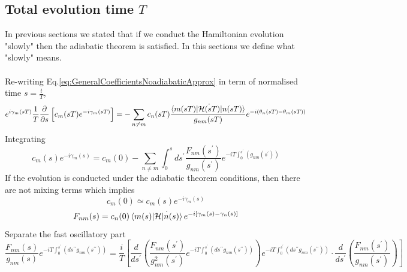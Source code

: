 \subsection{Total evolution time $T$}
In previous sections we stated that if we conduct the Hamiltonian evolution "slowly" then the adiabatic theorem is satisfied. In this sections we define what "slowly" means. \\\\
Re-writing Eq.\ref{eq:GeneralCoefficientsNoadiabaticApprox} in term of normalised time $s = \frac{t}{T}$,
\begin{equation}
    e^{i\gamma_{m}(sT)}\frac{1}{T}\frac{\partial }{\partial s}\left[c_{m}(sT)e^{-i\gamma_{m}(sT)}\right] = -\sum_{n\neq m} c_{n}(sT) \frac{\braket{m(sT)|\dot{\mathcal{H}(sT)}|n(sT)}}{g_{nm}(sT)}e^{-i\left(\theta_{n}(sT) - \theta_{m}(sT)\right)}
\end{equation}
Integrating
\begin{equation}
    c_{m}(s)e^{-i\gamma_{m}(s)} = c_{m}(0) - \sum_{n\neq m}\int_{0}^{s} ds^{\prime}\frac{F_{nm}(s^{\prime})}{g_{nm}(s^{\prime})}e^{-iT\int_{0}^{s^{\prime}}\left(g_{nm}(s^{\prime})\right)}
\end{equation}
If the evolution is conducted under the adiabatic theorem conditions, then there are not mixing terms which implies
\begin{equation}
    c_{m}(0) \simeq c_{m}(s)e^{-i\gamma_{m}(s)}
\end{equation}
\begin{equation}
    F_{nm}(s) = c_{n}(0)\braket{m(s)|\dot{\mathcal{H}|n(s)}} e^{-i\left[\gamma_{m}(s) - \gamma_{n}(s)\right]}
\end{equation}
Separate the fast oscillatory part
\begin{equation}
\frac{F_{nm}(s)}{g_{nm}(s)} e^{-iT\int_{0}^{s^{\prime}}\left(ds^{\prime \prime}g_{nm}(s^{\prime\prime}) \right)} = \frac{i}{T}\left[\frac{d}{ds^{\prime}}\left(\frac{F_{nm}(s^{\prime})}{g^{2}_{nm}(s^{\prime})} e^{-iT\int_{0}^{s^{\prime}}\left(ds^{\prime \prime}g_{nm}(s^{\prime\prime}) \right)}\right) e^{-iT\int_{0}^{s^{\prime}}\left(ds^{\prime \prime}g_{nm}(s^{\prime\prime}) \right)} \cdot \frac{d}{ds^{\prime}}\left(\frac{F_{nm}(s^{\prime})}{g_{nm}(s^{\prime})}\right)\right] 
 \end{equation}

